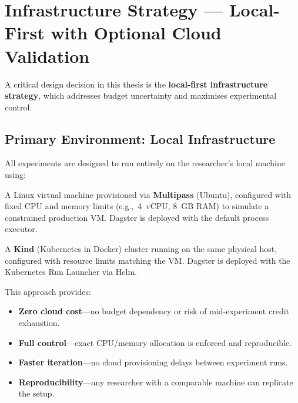 
\section{Infrastructure Strategy --- Local-First with Optional Cloud Validation}
\label{sec:infrastructure}

A critical design decision in this thesis is the \textbf{local-first infrastructure strategy}, which addresses budget uncertainty and maximises experimental control.

\subsection{Primary Environment: Local Infrastructure}
\label{subsec:local-infra}

All experiments are designed to run entirely on the researcher's local machine using:

\begin{description}[style=nextline]
  \item[VM Baseline] A Linux virtual machine provisioned via \textbf{Multipass} (Ubuntu), configured with fixed CPU and memory limits (e.g.,\ 4~vCPU, 8~GB RAM) to simulate a constrained production VM. Dagster is deployed with the default process executor.
  \item[Kubernetes Comparison] A \textbf{Kind} (Kubernetes in Docker) cluster running on the same physical host, configured with resource limits matching the VM. Dagster is deployed with the Kubernetes Run Launcher via Helm.
\end{description}

This approach provides:

\begin{itemize}
  \item \textbf{Zero cloud cost}---no budget dependency or risk of mid-experiment credit exhaustion.
  \item \textbf{Full control}---exact CPU/memory allocation is enforced and reproducible.
  \item \textbf{Faster iteration}---no cloud provisioning delays between experiment runs.
  \item \textbf{Reproducibility}---any researcher with a comparable machine can replicate the setup.
\end{itemize}

